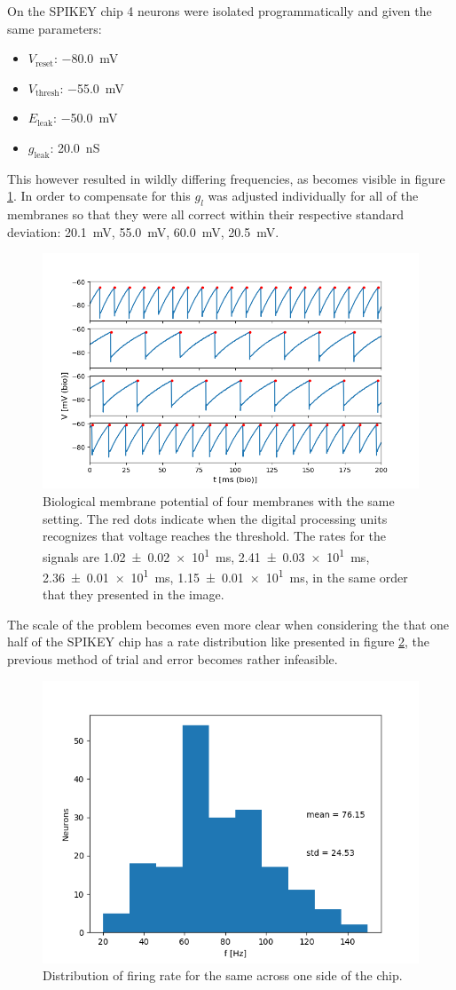 \documentclass[a4paper,twocolumn]{article}
\begin{document}
On the SPIKEY chip 4 neurons were isolated programmatically and given the same
parameters:
\begin{itemize}
    \item $V_\text{reset}$: \SI{-80.0}{\milli\volt}
    \item $V_\text{thresh}$: \SI{-55.0}{\milli\volt}
    \item $E_\text{leak}$: \SI{-50.0}{\milli\volt}
    \item $g_\text{leak}$:  \SI{20.0}{\nano\siemens}
\end{itemize}

This however resulted in wildly differing frequencies, as becomes visible in
figure \ref{fig:4membranes}. In order to compensate for this $g_l$ was adjusted
individually for all of the membranes so that they were all correct within their
respective standard deviation: \SI{20.1}{\milli\volt}, \SI{55.0}{\milli\volt},
\SI{60.0}{\milli\volt}, \SI{20.5}{\milli\volt}.

\begin{figure}[ht]
    \centering
    \includegraphics[width=.5\textwidth]{figures/4membranes.png}
    \caption{Biological membrane potential of four membranes with the same
    setting. The red dots indicate when the digital processing units recognizes
    that voltage reaches the threshold. The rates for the signals are
    \SI{1.02(2)e1}{\milli\second}, \SI{2.41(3)e1}{\milli\second},
    \SI{2.36(1)e1}{\milli\second}, \SI{1.15(1)e1}{\milli\second}, in the same
    order that they presented in the image. }
    \label{fig:4membranes}
\end{figure}

The scale of the problem becomes even more clear when considering the that one
half of the SPIKEY chip has a rate distribution like presented in figure
\ref{fig:distribution}, the previous method of trial and error becomes rather
infeasible.

\begin{figure}[ht]
    \centering
    \includegraphics[width=.5\textwidth]{figures/rate-distribution.png}
    \caption{Distribution of firing rate for the same across one side of the
    chip.}
    \label{fig:distribution}
\end{figure}
\end{document}
